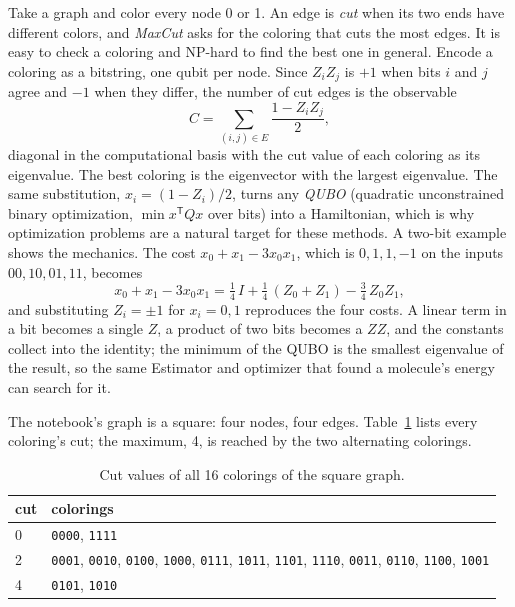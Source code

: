 \documentclass[11pt]{article}
\newcommand{\code}[1]{\texttt{#1}}
\begin{document}
Take a graph and color every node 0 or 1. An edge is \emph{cut} when its two ends have different colors, and \emph{MaxCut} asks for the coloring that cuts the most edges. It is easy to check a coloring and NP-hard to find the best one in general. Encode a coloring as a bitstring, one qubit per node. Since $Z_iZ_j$ is $+1$ when bits $i$ and $j$ agree and $-1$ when they differ, the number of cut edges is the observable
\begin{equation}
C = \sum_{(i,j)\in E} \frac{1 - Z_iZ_j}{2} ,
\label{eq:maxcut}
\end{equation}
diagonal in the computational basis with the cut value of each coloring as its eigenvalue. The best coloring is the eigenvector with the largest eigenvalue. The same substitution, $x_i = (1 - Z_i)/2$, turns any \emph{QUBO} (quadratic unconstrained binary optimization, $\min x^{\mathsf T}Qx$ over bits) into a Hamiltonian, which is why optimization problems are a natural target for these methods. A two-bit example shows the mechanics. The cost $x_0 + x_1 - 3x_0x_1$, which is $0, 1, 1, -1$ on the inputs $00, 10, 01, 11$, becomes
\begin{equation}
x_0 + x_1 - 3x_0x_1 = \tfrac14\,I + \tfrac14\,(Z_0 + Z_1) - \tfrac34\,Z_0Z_1 ,
\label{eq:qubo}
\end{equation}
and substituting $Z_i = \pm1$ for $x_i = 0, 1$ reproduces the four costs. A linear term in a bit becomes a single $Z$, a product of two bits becomes a $ZZ$, and the constants collect into the identity; the minimum of the QUBO is the smallest eigenvalue of the result, so the same Estimator and optimizer that found a molecule's energy can search for it.

The notebook's graph is a square: four nodes, four edges. Table~\ref{tab:cuts} lists every coloring's cut; the maximum, 4, is reached by the two alternating colorings.

\begin{table}[h]
\centering
\small
\begin{tabular}{@{}ll@{}}
\toprule
cut & colorings \\
\midrule
0 & \code{0000}, \code{1111} \\
2 & \code{0001}, \code{0010}, \code{0100}, \code{1000}, \code{0111}, \code{1011}, \code{1101}, \code{1110}, \code{0011}, \code{0110}, \code{1100}, \code{1001} \\
4 & \code{0101}, \code{1010} \\
\bottomrule
\end{tabular}
\caption{Cut values of all 16 colorings of the square graph.}
\label{tab:cuts}
\end{table}
\end{document}
